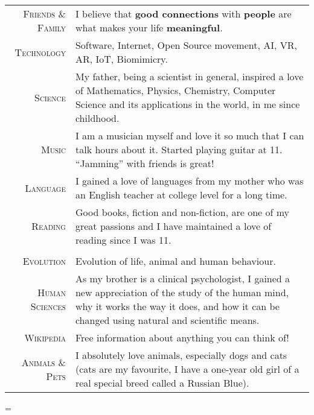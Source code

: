 \documentclass[a4paper,10pt,notitlepage]{article}
\newenvironment{absolutelynopagebreak}
  {\par\nobreak\vfil\penalty0\vfilneg
   \vtop\bgroup}
  {\par\xdef\tpd{\the\prevdepth}\egroup
   \prevdepth=\tpd}
\begin{document}
\begin{absolutelynopagebreak}
\begin{tabular}{r|p{11cm}}
		\textsc{Friends \& Family}    & I believe that \textbf{good connections} with \textbf{people} are what makes your life \textbf{meaningful}. \\                                                                                                                                                                                                                                                                                    
		\textsc{Technology}           & Software, Internet, Open Source movement, AI, VR, AR, IoT, Biomimicry. \\                                                                                                                                                                                                                                                                                                                         
		\textsc{Science}              & My father, being a scientist in general, inspired a love of Mathematics, Physics, Chemistry, Computer Science and                                   its applications in the world, in me since childhood. \\                                                                                                                                                                                                                        
		\textsc{Music}                & I am a musician myself and love it so much that I can talk hours about it. Started playing guitar at 11. ``Jamming''                                 with friends is great! \\
		\textsc{Language}             & I gained a love of languages from my mother who was an English teacher at college level for a long time. \\
		\textsc{Reading}              & Good books, fiction and non-fiction, are one of my great passions and I have maintained a love of reading since I was 11.                                   \\
		 
		\multicolumn{2}{c}{} \\
		  
		\textsc{Evolution}            & Evolution of life, animal and human behaviour.  \\
		\textsc{Human Sciences}       & As my brother is a clinical psychologist, I gained a new appreciation of the study of the human mind, why it works the way it does, and how it can be changed using natural and scientific means. \\
		\textsc{Wikipedia}            & Free information about anything you can think of! \\
		\textsc{Animals \& Pets}      & I absolutely love animals, especially dogs and cats (cats are my favourite, I have a one-year old girl of a real special breed called a Russian Blue). \\
		 

\end{tabular}
\end{absolutelynopagebreak}
\end{document}
